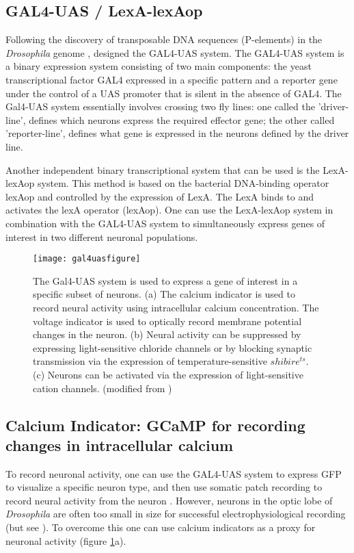 \subsection{GAL4-UAS / LexA-lexAop}
Following the discovery of transposable DNA sequences (P-elements) in the \textit{Drosophila} genome \parencite{Rubin1982}, \cite{Brand1993} designed the GAL4-UAS system. The GAL4-UAS system is a binary expression system consisting of two main components: the yeast transcriptional factor GAL4 expressed in a specific pattern and a reporter gene under the control of a UAS promoter that is silent in the absence of GAL4. The Gal4-UAS system essentially involves crossing two fly lines: one called the 'driver-line', defines which neurons express the required effector gene; the other called 'reporter-line', defines what gene is expressed in the neurons defined by the driver line. 

Another independent binary transcriptional system that can be used is the LexA-lexAop system. This method is based on the bacterial DNA-binding operator lexAop and controlled by the expression of LexA. The LexA binds to and activates the lexA operator (lexAop). One can use the LexA-lexAop system in combination with the GAL4-UAS system to simultaneously express genes of interest in two different neuronal populations. %
\begin{figure}
\centering
\hspace*{-1cm} 
\texttt{[image: gal4uasfigure]}
\caption[Genetic tools for functional manipulations in \textit{Drosophila}] {The Gal4-UAS system is used to express a gene of interest in a specific subset of neurons. (a) The calcium indicator is used to record neural activity using intracellular calcium concentration. The voltage indicator is used to optically record membrane potential changes in the neuron. (b) Neural activity can be suppressed by expressing light-sensitive chloride channels or by blocking synaptic transmission via the expression of temperature-sensitive $shibire^{ts}$. (c) Neurons can be activated via the expression of light-sensitive cation channels. (modified from \cite{Borst2009})}
\label{fig:gal4uas}
\end{figure}
\subsection{Calcium Indicator: GCaMP for recording changes in intracellular calcium}
To record neuronal activity, one can use the GAL4-UAS system to express GFP to visualize a specific neuron type, and then use somatic patch recording to record neural activity from the neuron \parencite{Wilson2004, Joesch2008}. However, neurons in the optic lobe of \textit{Drosophila} are often too small in size for successful electrophysiological recording (but see \cite{Groschner2022}). To overcome this one can use calcium indicators as a proxy for neuronal activity (figure  \ref{fig:gal4uas}a). 

